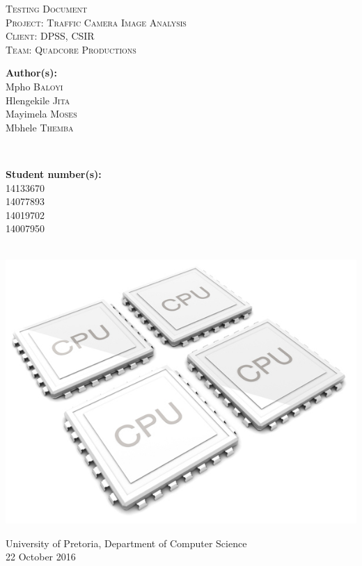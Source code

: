 \documentclass[a4paper,12pt]{article}
\begin{document}
\begin{titlepage}
\center

\textsc{\LARGE Testing Document}\\[1.5cm]
\textsc{\Large Project: Traffic Camera Image Analysis}\\[1.5cm]
\textsc{\large Client: DPSS, CSIR}\\[0.5cm]
\textsc{\large Team: Quadcore Productions}\\[0.5cm]

\begin{minipage}{0.4\textwidth}
\begin{flushleft} \large
\textbf{Author(s):}\\
Mpho \textsc{Baloyi}\\
Hlengekile \textsc{Jita}\\
Mayimela \textsc{Moses}\\
Mbhele \textsc{Themba}\\
\end{flushleft}
\end{minipage}
~
\begin{minipage}{0.4\textwidth}
\begin{flushright} \large
\textbf{Student number(s):} \\
14133670\\ %
14077893\\
14019702\\
14007950\\
\end{flushright}
\end{minipage}\\

\includegraphics[width=\textwidth]{2012-quad-core-phones.jpg}

{\large University of Pretoria, Department of Computer Science}\\

{\large 22 October 2016}\\[3cm]

\vfil

\end{titlepage}
\end{document}
